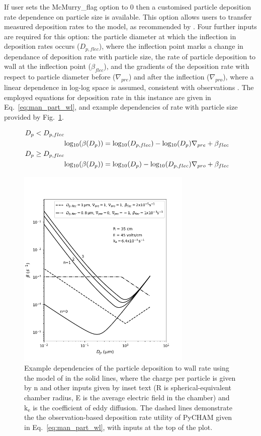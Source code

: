 \documentclass[gmd, manuscript]{copernicus}
\begin{document}
If user sets the McMurry\_flag option to 0 then a customised particle deposition rate dependence on particle size is available.  This option allows users to transfer measured deposition rates to the model, as recommended by \citet{Wang2018}.  Four further inputs are required for this option: the particle diameter at which the inflection in deposition rates occurs ($D_{p,flec}$), where the inflection point marks a change in dependance of deposition rate with particle size, the rate of particle deposition to wall at the inflection point ($\beta_{flec}$), and the gradients of the deposition rate with respect to particle diameter before ($\nabla_{pre}$) and after the inflection ($\nabla_{pro}$), where a linear dependence in log-log space is assumed, consistent with observations \citep{Charan2019}.  The employed equations for deposition rate in this instance are given in Eq.~\ref{eq:man_part_wl}, and example dependencies of rate with particle size provided by Fig.~\ref{fig:part_wall_depo_plot}.

\begin{align} \label{eq:man_part_wl}
D_{p}<D_{p,flec} \nonumber \\
&\rm{log_{10}}(\mit{\beta(D_{p}})) = \rm{log_{10}}(\mit{D_{p,flec}})-\rm{log_{10}}\mit{(D_{p})}\nabla_{pre}+\beta_{flec} \nonumber \\
D_{p}\geq D_{p,flec} \nonumber \\
&\rm{log_{10}}(\mit{\beta(D_{p}})) = \rm{log_{10}}(\mit{D_{p}})-\rm{log_{10}}\mit{(D_{p,flec})}\nabla_{pro}+\beta_{flec}
\end{align}

\begin{figure}[t]
\includegraphics[width=8.3cm]{Results/part_wall_depo_plot.png}
\caption{Example dependencies of the particle deposition to wall rate using the model of \citet{McMurry1985} in the solid lines, where the charge per particle is given by n and other inputs given by inset text (R is spherical-equivalent chamber radius, E is the average electric field in the chamber) and $\mathrm{k_e}$ is the coefficient of eddy diffusion.  The dashed lines demonstrate the the observation-based deposition rate utility of PyCHAM given in Eq.~\ref{eq:man_part_wl}, with inputs at the top of the plot.}
\label{fig:part_wall_depo_plot}
\end{figure}
\end{document}
